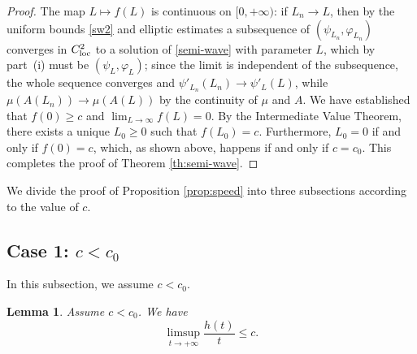 \documentclass[reqno]{amsart}
\newcommand{\rev}[1]{#1}
\theoremstyle{plain}
\newtheorem{lemma}[theorem]{Lemma}
\theoremstyle{definition}
\theoremstyle{remark}
\begin{document}
\begin{proof}
		\rev{The map $L\mapsto f(L)$ is continuous on $[0,+\infty)$: if $L_n\to L$,
		then by the uniform bounds \eqref{sw2} and elliptic estimates a subsequence
		of $(\psi_{L_n},\varphi_{L_n})$ converges in $C^2_{\rm loc}$ to a solution of
		\eqref{semi-wave} with parameter $L$, which by part~(i) must be
		$(\psi_L,\varphi_L)$; since the limit is independent of the subsequence, the
		whole sequence converges and $\psi'_{L_n}(L_n)\to\psi'_L(L)$, while
		$\mu(A(L_n))\to\mu(A(L))$ by the continuity of $\mu$ and $A$.} We have established that $f(0) \ge c$ and $\lim_{L\to\infty} f(L) = 0$. By the Intermediate Value Theorem, there exists a unique $L_0 \ge 0$ such that $f(L_0) = c$. Furthermore, $L_0 = 0$ if and only if $f(0) = c$, which, as shown above, happens if and only if $c = c_0$. This completes the proof of Theorem \ref{th:semi-wave}.
	\end{proof}
	
	We divide the proof of Proposition \ref{prop:speed} into three subsections according to the value of $c$.
	
	\subsection{Case 1: $c < c_0$} In this subsection, we assume $c < c_0$.
	
	\begin{lemma}\label{lem:limsup} Assume $c < c_0$. We have
		\[
		\limsup_{t \to +\infty} \frac{h(t)}{t} \le c.
		\]
	\end{lemma}
	
\end{document}
